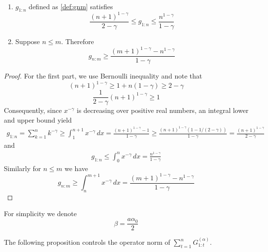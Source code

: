 \begin{proposition}
~ \\
\label{prop:gnm_lowerbound}
\begin{enumerate}
    \item  
    $g_{1:n}$ defined as \eqref{def:gnm} satisfies
    \begin{equation}
        \label{bound:gnm}
        \frac{(n+1)^{1-\gamma}}{2 - \gamma} \leq g_{1:n} \leq  \frac{n^{1-\gamma}}{1 - \gamma} 
    \end{equation}

    \item Suppose $n \leq m$. Therefore 
    \begin{equation}
        g_{n:m} \geq \frac{(m+1)^{1-\gamma} - n^{1-\gamma}}{1 - \gamma}
    \end{equation}
\end{enumerate}
\end{proposition}

\begin{proof}
    For the first part, we use Bernoulli inequality and note that
    \[
        (n+1)^{1-\gamma} \geq 1+ n(1-\gamma) \geq 2 - \gamma
    \]
    \[
        \frac{1}{2-\gamma} (n+1)^{1-\gamma} \geq 1
    \]
    Consequently, since $x^{-\gamma}$ is decreasing over positive real numbers, an integral lower and upper bound yield \begin{align}
        g_{1:n} = \sum_{k=1}^n k^{-\gamma} \geq \int_{1}^{n+1} x^{-\gamma} \, dx = \frac{(n+1)^{1-\gamma} - 1}{1 - \gamma} \geq \frac{(n+1)^{1-\gamma} (1-1/(2-\gamma))}{1-\gamma} = \frac{(n+1)^{1-\gamma}}{2-\gamma}
    \end{align}
    and 
    \begin{align}
        g_{1:n} \leq \int_{0}^n x^{-\gamma} \, d x = \frac{n^{1-\gamma}}{1-\gamma}
    \end{align}
    Similarly for $n \leq m$ we have
    \begin{equation}
        g_{n:m} \geq \int_{n}^{m+1} x^{-\gamma} \, d x = \frac{(m+1)^{1-\gamma} - n^{1-\gamma}}{1 - \gamma}
    \end{equation}
\end{proof}

For simplicity we denote
\begin{equation}
    \label{def:beta}
    \beta = \frac{a \alpha_0}{2}
\end{equation}

The following proposition controls the operator norm of $\sum_{t=1}^n G_{1:t}^{(\alpha)}$.

